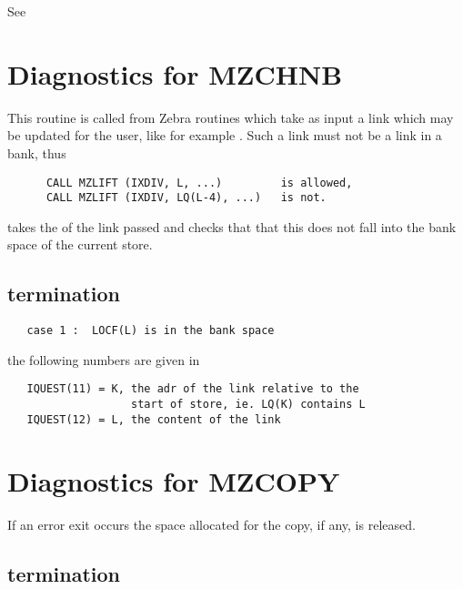 
See 

\section{Diagnostics for MZCHNB}


This routine is called from Zebra routines which take as input
a link which may be updated for the user, like for example .
Such a link must not be a link in a bank, thus

\begin{verbatim}
      CALL MZLIFT (IXDIV, L, ...)         is allowed,
      CALL MZLIFT (IXDIV, LQ(L-4), ...)   is not.
\end{verbatim}

 takes the  of the link passed and checks that that this
does not fall into the bank space of the current store.

\subsection*{ termination}

\begin{verbatim}
   case 1 :  LOCF(L) is in the bank space
\end{verbatim}

the following numbers are given in 

\begin{verbatim}
   IQUEST(11) = K, the adr of the link relative to the
                   start of store, ie. LQ(K) contains L
   IQUEST(12) = L, the content of the link
\end{verbatim}

\section{Diagnostics for MZCOPY}


      If an error exit occurs the space allocated for the copy,
      if any, is released.

\subsection*{ termination}

